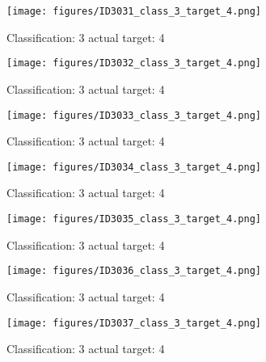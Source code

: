 \begin{figure}[h!]
\begin{center}
\texttt{[image: figures/ID3031\_class\_3\_target\_4.png]}
\end{center}
\caption{ Classification: 3 actual target: 4}
\label{fig:ID3031_class_3_target_4}
\end{figure}
\begin{figure}[h!]
\begin{center}
\texttt{[image: figures/ID3032\_class\_3\_target\_4.png]}
\end{center}
\caption{ Classification: 3 actual target: 4}
\label{fig:ID3032_class_3_target_4}
\end{figure}
\begin{figure}[h!]
\begin{center}
\texttt{[image: figures/ID3033\_class\_3\_target\_4.png]}
\end{center}
\caption{ Classification: 3 actual target: 4}
\label{fig:ID3033_class_3_target_4}
\end{figure}
\begin{figure}[h!]
\begin{center}
\texttt{[image: figures/ID3034\_class\_3\_target\_4.png]}
\end{center}
\caption{ Classification: 3 actual target: 4}
\label{fig:ID3034_class_3_target_4}
\end{figure}
\begin{figure}[h!]
\begin{center}
\texttt{[image: figures/ID3035\_class\_3\_target\_4.png]}
\end{center}
\caption{ Classification: 3 actual target: 4}
\label{fig:ID3035_class_3_target_4}
\end{figure}
\begin{figure}[h!]
\begin{center}
\texttt{[image: figures/ID3036\_class\_3\_target\_4.png]}
\end{center}
\caption{ Classification: 3 actual target: 4}
\label{fig:ID3036_class_3_target_4}
\end{figure}
\begin{figure}[h!]
\begin{center}
\texttt{[image: figures/ID3037\_class\_3\_target\_4.png]}
\end{center}
\caption{ Classification: 3 actual target: 4}
\label{fig:ID3037_class_3_target_4}
\end{figure}

